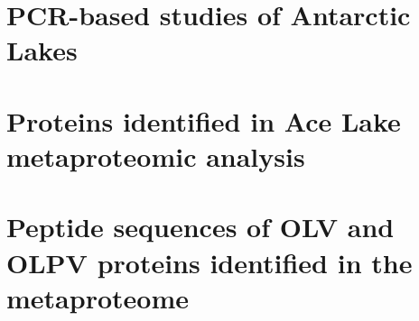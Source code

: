 \setcounter{secnumdepth}{1}
\begin{appendices}

\chapter{PCR-based studies of Antarctic Lakes}
\label{app:A}



\chapter{Proteins identified in Ace Lake metaproteomic analysis}
\label{app:B}







\chapter{Peptide sequences of OLV and OLPV proteins identified in the metaproteome} 
\label{app:C}
\newpage



\end{appendices}
